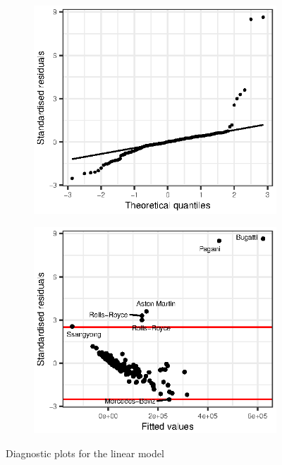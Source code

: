 \documentclass[titlepage]{article}
\begin{document}
\begin{figure}[!htb]
  \begin{subfigure}{0.5\linewidth}
    \centering
    \includegraphics{q3-qq-classic}
    \label{fig:q3-qq-resp-orig}
  \end{subfigure}
  \begin{subfigure}{0.5\linewidth}
    \centering
    \includegraphics{q3-resids-vs-fitted-classic}
    \label{fig:q3-resids-vs-fitted-orig}
  \end{subfigure}
  \caption{Diagnostic plots for the linear model}
\end{figure}
\end{document}
